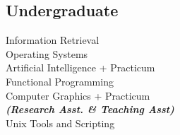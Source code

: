 \documentclass[letterpaper]{deedy-resume} %
\begin{document}
\begin{minipage}[t]{0.33\textwidth}
\sectionspace


\subsection{Undergraduate}

Information Retrieval \\
Operating Systems \\
Artificial Intelligence + Practicum \\
Functional Programming \\
Computer Graphics + Practicum \\
{\footnotesize \textit{\textbf{(Research Asst. \& Teaching Asst) }}} \\
Unix Tools and Scripting

\sectionspace


\end{minipage} %
\hfill
%
%
\end{document}
